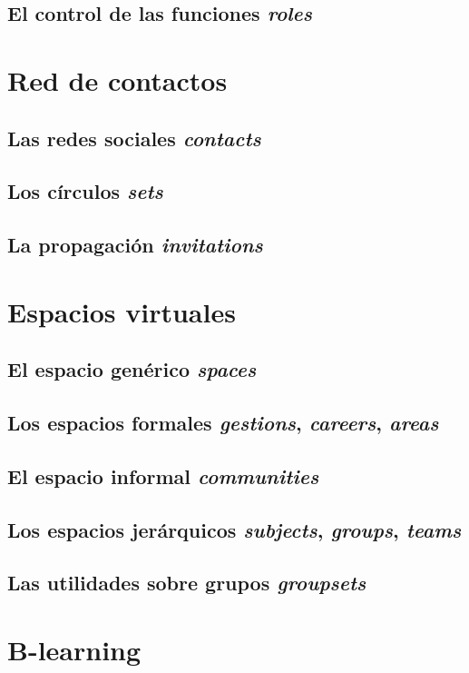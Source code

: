 \subsection{El control de las funciones \emph{roles}}

\section{Red de contactos}
\subsection{Las redes sociales \emph{contacts}}
\subsection{Los círculos \emph{sets}}
\subsection{La propagación \emph{invitations}}

\section{Espacios virtuales}
\subsection{El espacio genérico \emph{spaces}}
\subsection{Los espacios formales \emph{gestions}, \emph{careers},
\emph{areas}}
\subsection{El espacio informal \emph{communities}}
\subsection{Los espacios jerárquicos \emph{subjects}, \emph{groups},
\emph{teams}}
\subsection{Las utilidades sobre grupos \emph{groupsets}}

\section{B-learning}

